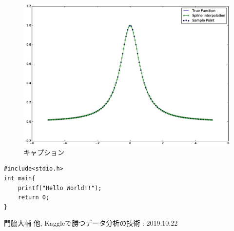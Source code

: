 \documentclass[titlepage, a4paper, 11pt, dvipdfmx]{jsarticle}
\begin{document}
\begin{figure}[H]
\begin{center}%
\includegraphics[width=13.5cm]{./graphics/graph.eps}%
\caption{キャプション}
\label{Label}%
\end{center}
\end{figure}


\begin{lstlisting}[caption=キャプション, label=Label_Program_2]
#include<stdio.h>
int main{
    printf("Hello World!!");
    return 0;
}
\end{lstlisting}

\begin{thebibliography}{1}
 門脇大輔 他, Kaggleで勝つデータ分析の技術 : 2019.10.22
\end{thebibliography}
\end{document}

